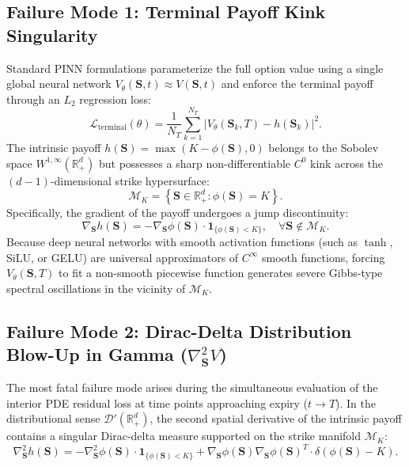\documentclass[11pt,a4paper]{article}
\begin{document}
\subsection{Failure Mode 1: Terminal Payoff Kink Singularity}
Standard PINN formulations parameterize the full option value using a single global neural network $V_\theta(\mathbf{S}, t) \approx V(\mathbf{S}, t)$ and enforce the terminal payoff through an $L_2$ regression loss:
\begin{equation}
\label{eq:standard_terminal_loss}
\mathcal{L}_{\text{terminal}}(\theta) = \frac{1}{N_T} \sum_{k=1}^{N_T} \left| V_\theta(\mathbf{S}_k, T) - h(\mathbf{S}_k) \right|^2.
\end{equation}
The intrinsic payoff $h(\mathbf{S}) = \max\left(K - \phi(\mathbf{S}), 0\right)$ belongs to the Sobolev space $W^{1, \infty}(\mathbb{R}_+^d)$ but possesses a sharp non-differentiable $C^0$ kink across the $(d-1)$-dimensional strike hypersurface:
\begin{equation}
\label{eq:strike_manifold}
\mathcal{M}_K = \left\{ \mathbf{S} \in \mathbb{R}_+^d : \phi(\mathbf{S}) = K \right\}.
\end{equation}
Specifically, the gradient of the payoff undergoes a jump discontinuity:
\begin{equation}
\label{eq:gradient_jump}
\nabla_{\mathbf{S}} h(\mathbf{S}) = -\nabla_{\mathbf{S}} \phi(\mathbf{S}) \cdot \mathbf{1}_{\{\phi(\mathbf{S}) < K\}}, \quad \forall \mathbf{S} \notin \mathcal{M}_K.
\end{equation}
Because deep neural networks with smooth activation functions (such as $\tanh$, SiLU, or GELU) are universal approximators of $C^\infty$ smooth functions, forcing $V_\theta(\mathbf{S}, T)$ to fit a non-smooth piecewise function generates severe Gibbs-type spectral oscillations in the vicinity of $\mathcal{M}_K$.

\subsection{Failure Mode 2: Dirac-Delta Distribution Blow-Up in Gamma \texorpdfstring{($\nabla^2_{\mathbf{S}} V$)}{(Gamma)}}
The most fatal failure mode arises during the simultaneous evaluation of the interior PDE residual loss at time points approaching expiry ($t \to T$). In the distributional sense $\mathcal{D}'(\mathbb{R}_+^d)$, the second spatial derivative of the intrinsic payoff contains a singular Dirac-delta measure supported on the strike manifold $\mathcal{M}_K$:
\begin{equation}
\label{eq:dirac_delta_distribution}
\nabla^2_{\mathbf{S}} h(\mathbf{S}) = -\nabla^2_{\mathbf{S}} \phi(\mathbf{S}) \cdot \mathbf{1}_{\{\phi(\mathbf{S}) < K\}} + \nabla_{\mathbf{S}} \phi(\mathbf{S}) \nabla_{\mathbf{S}} \phi(\mathbf{S})^T \cdot \delta(\phi(\mathbf{S}) - K).
\end{equation}
\end{document}
